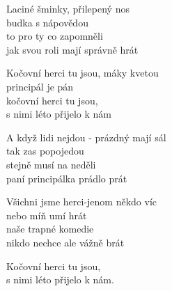 
\ve{}
Laciné šminky, přilepený nos\\
budka s nápovědou\\
to pro ty co zapomněli\\
jak svou roli mají správně hrát

\cho{}
Kočovní herci tu jsou, máky kvetou\\
principál je pán\\
kočovní herci tu jsou,\\
s nimi léto přijelo k nám

\ve{}
A když lidi nejdou - prázdný mají sál\\
tak zas popojedou\\
stejně musí na neděli\\
paní principálka prádlo prát  

\cho{}

\ve{}
Všichni jsme herci-jenom někdo víc\\
nebo míň umí hrát\\
naše trapné komedie\\
nikdo nechce ale vážně brát

\cho{}

\re{*:}
Kočovní herci tu jsou,\\
s nimi léto přijelo k nám.

\esong